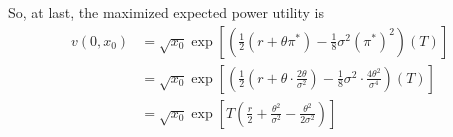 \documentclass[12pt]{article}
\begin{document}
        So, at last, the maximized expected power utility is 
        \begin{align*}
            v(0, x_0) &= \sqrt{x_0} \exp\left[\left(\frac{1}{2}(r + \theta \pi^*) - \frac{1}{8}\sigma^2 (\pi^*)^2\right)(T)\right]\\ 
            &= \sqrt{x_0}\exp\left[\left(\frac{1}{2}(r + \theta \cdot \frac{2\theta}{\sigma^2}) - \frac{1}{8}\sigma^2 \cdot \frac{4\theta^2}{\sigma^4}\right)(T)\right]\\ 
            &= \boxed{\sqrt{x_0}\exp\left[T\left(\frac{r}{2} + \frac{\theta^2}{\sigma^2} - \frac{\theta^2}{2\sigma^2}\right)\right]}
        \end{align*}

        
    \color{black}
\end{document}
